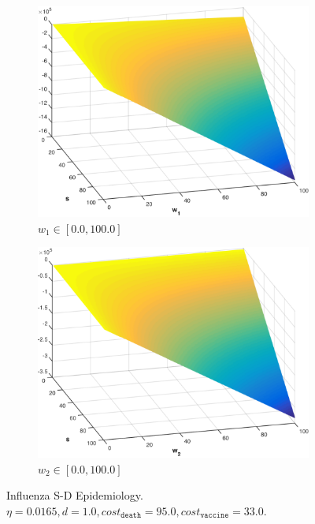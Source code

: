 \begin{figure}[t!]
    \centering
    \begin{subfigure}[b]{0.4\textwidth}
        \includegraphics[width=\linewidth, height=0.8\linewidth]{images/sd_w1}
        \caption{$ w_1 \in \left[ 0.0, 100.0 \right]$}
        \label{fig:opt_execution_w1}
        \vspace{1em}
    \end{subfigure}
    
    \begin{subfigure}[b]{0.4\textwidth}
        \includegraphics[width=\linewidth, height=0.8\linewidth]{images/sd_w2}
        \caption{$ w_2 \in \left[ 0.0, 100.0 \right]$}
        \label{fig:pt_execution_w2}
    \end{subfigure}  
    \caption{Influenza S-D Epidemiology. $ \eta = 0.0165, d = 1.0, cost_{\mathtt{death}} = 95.0, cost_{\mathtt{vaccine}} = 33.0$.}
    \label{fig:pt_execution}
\end{figure}

